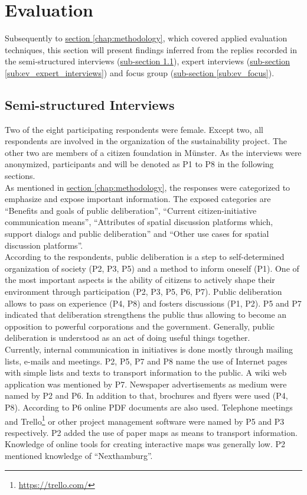 \section{Evaluation}
\label{chap:evaluation}
Subsequently to \hyperref[chap:methodology]{section \ref{chap:methodology}}, which covered applied evaluation techniques, this section will present findings inferred from the replies recorded in the semi-structured interviews (\hyperref[sub:ev_interviews]{sub-section \ref{sub:ev_interviews}}), expert interviews (\hyperref[sub:ev_expert_interviews]{sub-section \ref{sub:ev_expert_interviews}}) and focus group (\hyperref[sub:ev_focus]{sub-section \ref{sub:ev_focus}}).

\subsection{Semi-structured Interviews}
\label{sub:ev_interviews}
Two of the eight participating respondents were female. Except two, all respondents are involved in the organization of the sustainability project. The other two are members of a citizen foundation in M{\"u}nster. As the interviews were anonymized, participants and will be denoted as P1 to P8 in the following sections.\\
As mentioned in \hyperref[chap:methodology]{section \ref{chap:methodology}}, the responses were categorized to emphasize and expose important information. The exposed categories are ``Benefits and goals of public deliberation'', ``Current citizen-initiative communication means'', ``Attributes of spatial discussion platforms which, support dialogs and public deliberation'' and ``Other use cases for spatial discussion platforms''.\\
According to the respondents, public deliberation is a step to self-determined organization of society (P2, P3, P5) and a method to inform oneself (P1). One of the most important aspects is the ability of citizens to actively shape their environment through participation (P2, P3, P5, P6, P7). Public deliberation allows to pass on experience (P4, P8) and fosters discussions (P1, P2). P5 and P7 indicated that deliberation strengthens the public thus allowing to become an opposition to powerful corporations and the government. Generally, public deliberation is understood as an act of doing useful things together.\\
Currently, internal communication in initiatives is done mostly through mailing lists, e-mails and meetings. P2, P5, P7 and P8 name the use of Internet pages with simple lists and texts to transport information to the public. A wiki web application was mentioned by P7. Newspaper advertisements as medium were named by P2 and P6. In addition to that, brochures and flyers were used (P4, P8). According to P6 online PDF documents are also used. Telephone meetings and Trello\footnote{\url{https://trello.com/}} or other project management software were named by P5 and P3 respectively. P2 added the use of paper maps as means to transport information. Knowledge of online tools for creating interactive maps was generally low.  P2 mentioned knowledge of ``Nexthamburg''.\\
